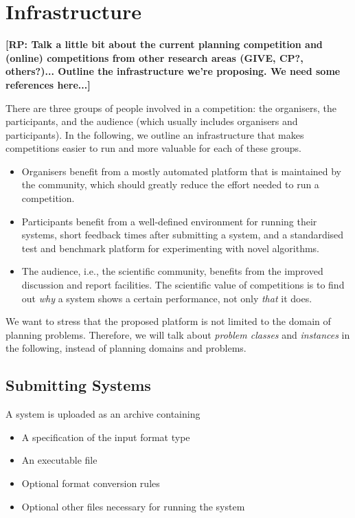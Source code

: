 \section{Infrastructure}
\label{sec:infrastructure}

\textbf{[RP: Talk a little bit about the current planning competition and (online)
competitions from other research areas (GIVE, CP?, others?)... Outline the
infrastructure we're proposing. We need some references here...]}

There are three groups of people involved in a competition: the organisers, the participants, and the audience (which usually includes organisers and participants). In the following, we outline an infrastructure that makes competitions easier to run and more valuable for each of these groups.

\begin{itemize}
  \item Organisers benefit from a mostly automated platform that is maintained by the community, which should greatly reduce the effort needed to run a competition.
  \item Participants benefit from a well-defined environment for running their systems, short feedback times after submitting a system, and a standardised test and benchmark platform for experimenting with novel algorithms.
  \item The audience, i.e., the scientific community, benefits from the improved discussion and report facilities. The scientific value of competitions is to find out \emph{why} a system shows a certain performance, not only \emph{that} it does.
\end{itemize}

We want to stress that the proposed platform is not limited to the domain of planning problems. Therefore, we will talk about \emph{problem classes} and \emph{instances} in the following, instead of planning domains and problems.

\subsection{Submitting Systems}

A system is uploaded as an archive containing
\begin{itemize}
  \item A specification of the input format type
  \item An executable file
  \item Optional format conversion rules
  \item Optional other files necessary for running the system
\end{itemize}

